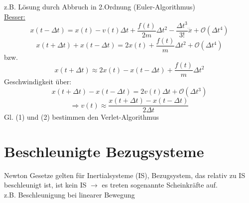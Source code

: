 \documentclass[titlepage,12pt,a4paper,ngerman]{report}
\begin{document}
{z.B. Lösung durch Abbruch in 2.Ordnung (Euler-Algorithmus)\\
\underline{Besser:}
$$x(t-\Delta t) = x(t) -v(t) \Delta t + \frac{f(t)}{2m} \Delta t^2 - \frac{\Delta t^3}{3!} \dddot{x} + \mathcal{O}(\Delta t^4)$$
$$ x(t+\Delta t) + x(t-\Delta t) = 2x(t) + \frac{f(t)}{m} \Delta t^2 + \mathcal{O}(\Delta t^4)$$
bzw.
\begin{equation*}
x(t+\Delta t) \approx 2 x(t) - x(t-\Delta t) + \frac{f(t)}{m} \Delta t^2 \tag{1}
\end{equation*}
Geschwindigkeit über:
$$x(t+ \Delta t) - x(t - \Delta t) = 2 v(t) \Delta t + \mathcal{O}(\Delta t^3)$$
\begin{equation*}
\Rightarrow v(t) \approx \frac{x(t+\Delta t) - x(t- \Delta t)}{2 \Delta t} \tag{2}
\end{equation*}
Gl. (1) und (2) bestimmen den Verlet-Algorithmus
\section{Beschleunigte Bezugsysteme}
Newton Gesetze gelten für Inertialsysteme (IS), Bezugsystem, das relativ zu IS beschleunigt ist, ist kein IS $\rightarrow$ es treten sogenannte Scheinkräfte auf.\\
z.B. Beschleunigung bei linearer Bewegung
}
\end{document}
